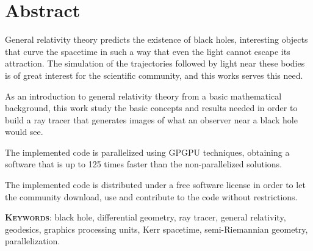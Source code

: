 \begingroup
\let\clearpage\relax
\let\cleardoublepage\relax
\let\cleardoublepage\relax

\chapter*{Abstract}
General relativity theory predicts the existence of black holes, interesting objects that curve the spacetime in such a way that even the light cannot escape its attraction. The simulation of the trajectories followed by light near these bodies is of great interest for the scientific community, and this works serves this need.

As an introduction to general relativity theory from a basic mathematical background, this work study the basic concepts and results needed in order to build a ray tracer that generates images of what an observer near a black hole would see.

The implemented code is parallelized using \ac{GPGPU} techniques, obtaining a software that is up to 125 times faster than the non-parallelized solutions.

The implemented code is distributed under a free software license in order to let the community download, use and contribute to the code without restrictions.

\vfill

\endgroup

\vfill

\textsc{\textbf{Keywords}}: black hole, differential geometry, ray tracer, general relativity, geodesics, graphics processing units, Kerr spacetime, semi-Riemannian geometry, parallelization.
